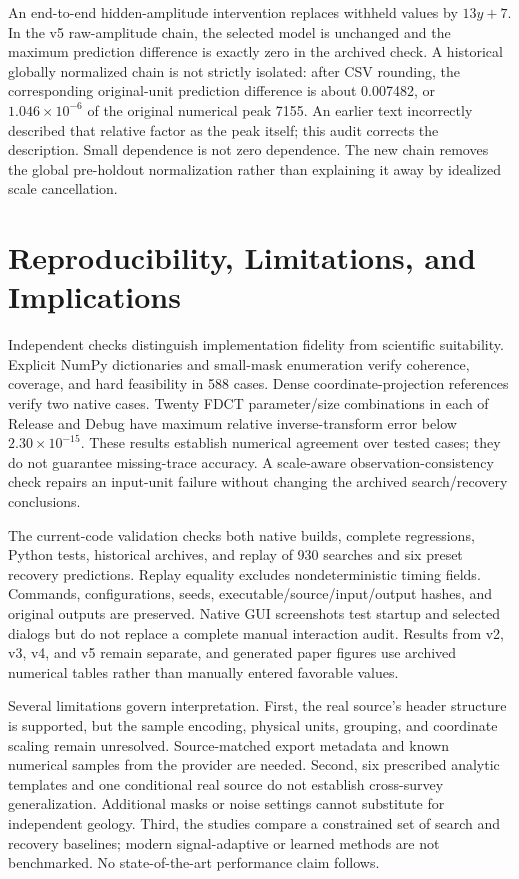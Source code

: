 \documentclass[journal]{IEEEtran}
\begin{document}
An end-to-end hidden-amplitude intervention replaces withheld values by $13y+7$. In the v5 raw-amplitude chain, the selected model is unchanged and the maximum prediction difference is exactly zero in the archived check. A historical globally normalized chain is not strictly isolated: after CSV rounding, the corresponding original-unit prediction difference is about 0.007482, or $1.046\times10^{-6}$ of the original numerical peak 7155. An earlier text incorrectly described that relative factor as the peak itself; this audit corrects the description. Small dependence is not zero dependence. The new chain removes the global pre-holdout normalization rather than explaining it away by idealized scale cancellation.

\section{Reproducibility, Limitations, and Implications}
Independent checks distinguish implementation fidelity from scientific suitability. Explicit NumPy dictionaries and small-mask enumeration verify coherence, coverage, and hard feasibility in 588 cases. Dense coordinate-projection references verify two native cases. Twenty FDCT parameter/size combinations in each of Release and Debug have maximum relative inverse-transform error below $2.30\times10^{-15}$. These results establish numerical agreement over tested cases; they do not guarantee missing-trace accuracy. A scale-aware observation-consistency check repairs an input-unit failure without changing the archived search/recovery conclusions.

The current-code validation checks both native builds, complete regressions, Python tests, historical archives, and replay of 930 searches and six preset recovery predictions. Replay equality excludes nondeterministic timing fields. Commands, configurations, seeds, executable/source/input/output hashes, and original outputs are preserved. Native GUI screenshots test startup and selected dialogs but do not replace a complete manual interaction audit. Results from v2, v3, v4, and v5 remain separate, and generated paper figures use archived numerical tables rather than manually entered favorable values.

Several limitations govern interpretation. First, the real source's header structure is supported, but the sample encoding, physical units, grouping, and coordinate scaling remain unresolved. Source-matched export metadata and known numerical samples from the provider are needed. Second, six prescribed analytic templates and one conditional real source do not establish cross-survey generalization. Additional masks or noise settings cannot substitute for independent geology. Third, the studies compare a constrained set of search and recovery baselines; modern signal-adaptive or learned methods are not benchmarked. No state-of-the-art performance claim follows.
\end{document}
